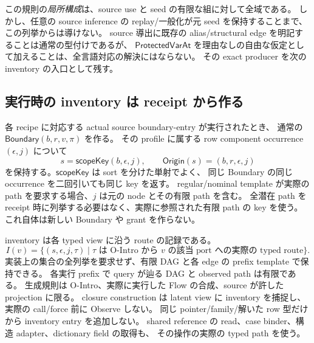 \documentclass[11pt,a4paper]{article}
\begin{document}
この規則の\emph{局所構成}は、source use と seed の有限な組に対して全域である。
しかし、任意の source inference の replay/一般化が元 seed を保持することまで、この列挙からは導けない。
source 導出に既存の alias/structural edge を明記することは通常の型付けであるが、
\(\mathsf{ProtectedVarAt}\) を理由なしの自由な仮定として加えることは、全言語対応の解決にはならない。
その exact producer を次の inventory の入口として残す。

\subsection{実行時の inventory は receipt から作る}

各 recipe に対応する actual source boundary-entry が実行されたとき、
通常の \(\mathsf{Boundary}(b,r,v,\pi)\) を作る。
その profile に属する row component occurrence \((\epsilon,j)\) について
\[
 s=\mathsf{scopeKey}(b,\epsilon,j),\qquad
 \mathsf{Origin}(s)=(b,r,\epsilon,j)
 \tag{O-Intro}
\]
を保持する。\(\mathsf{scopeKey}\) は sort を分けた単射でよく、
同じ Boundary の同じ occurrence を二回引いても同じ key を返す。
regular/nominal template が実際の path を要求する場合、\(j\) は元の node とその有限 path を含む。
全潜在 path を receipt 時に列挙する必要はなく、実際に参照された有限 path の key を使う。
これ自体は新しい Boundary や grant を作らない。

inventory は各 typed view に沿う route の記録である。
\[
 I(v)=\{(s,\epsilon,j,\tau)\mid
       \tau\text{ は O-Intro から }v\text{ の該当 port への実際の typed route}\}.
\]
実装上の集合の全列挙を要求せず、有限 DAG と各 edge の prefix template で保持できる。
各実行 prefix で query が辿る DAG と observed path は有限である。
生成規則は O-Intro、実際に実行した Flow の合成、source が許した projection に限る。
closure construction は latent view に inventory を捕捉し、実際の call/force 前に Observe しない。
同じ pointer/family/解いた row 型だけから inventory entry を追加しない。
shared reference の read、case binder、構造 adapter、dictionary field の取得も、
その操作の実際の typed path を使う。
\end{document}
